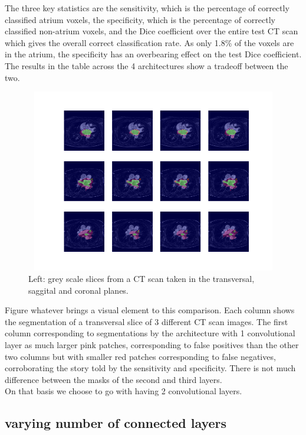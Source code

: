 \noindent The three key statistics are the sensitivity, which is the percentage of correctly classified atrium voxels, the specificity, which is the percentage of correctly classified non-atrium voxels, and the Dice coefficient over the entire test CT scan which gives the overall correct classification rate. As only 1.8\% of the voxels are in the atrium, the specificity has an overbearing effect on the test Dice coefficient. The results in the table across the 4 architectures show a tradeoff between the two. \\

\begin{figure}
\centering
\includegraphics[trim=2.5cm 1.5cm 2cm 1.5cm, clip=true, height=80mm, width=150mm]{Chapter3/mask_results_varying_number_of_convolutional_layers.png}
\caption{Left: grey scale slices from a CT scan taken in the transversal, saggital and coronal planes.}
\end{figure}

\noindent Figure whatever brings a visual element to this comparison. Each column shows the segmentation of a transversal slice of 3 different CT scan images. The first column corresponding to segmentations by the architecture with 1 convolutional layer as much larger pink patches, corresponding to false positives than the other two columns but with smaller red patches corresponding to false negatives, corroborating the story told by the sensitivity and specificity. There is not much difference between the masks of the second and third layers.\\

\noindent On that basis we choose to go with having 2 convolutional layers. 

\subsection{varying number of connected layers}

